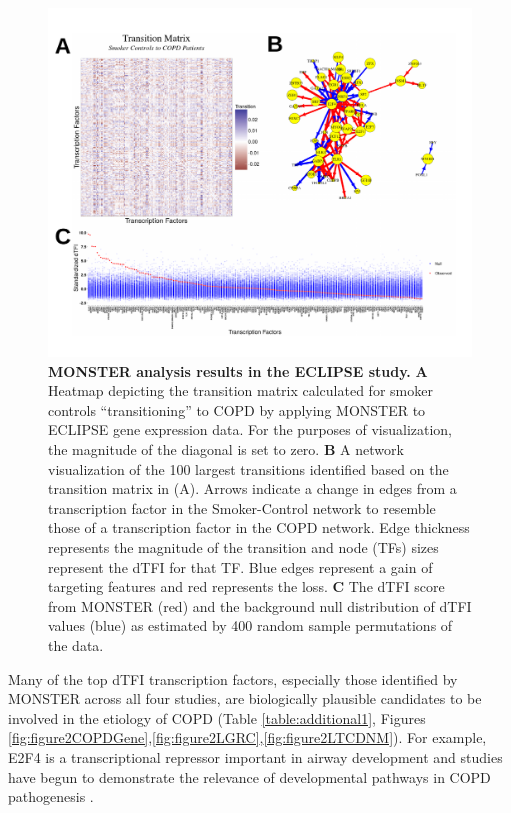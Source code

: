 \begin{figure}%
\centering
\includegraphics[width=1\linewidth]{figures/figure2_labeled}
\caption[MONSTER analysis results in the ECLIPSE study]{\textbf{MONSTER analysis results in the ECLIPSE study.} \textbf{A} Heatmap depicting the transition matrix calculated for smoker controls ``transitioning'' to COPD  by applying MONSTER to ECLIPSE gene expression data. For the purposes of visualization, the magnitude of the diagonal is set to zero. \textbf{B} A network visualization of the 100 largest transitions identified based on the transition matrix  in (A). Arrows indicate a change in edges from a transcription factor in the Smoker-Control network to resemble those of a transcription factor in the COPD network. Edge thickness represents the magnitude of the transition and node (TFs) sizes represent the dTFI for that TF. Blue edges represent a gain of targeting features and red represents the loss. \textbf{C} The dTFI score from MONSTER (red) and the background null distribution of dTFI values (blue) as estimated by 400 random sample permutations of the data.}
\label{fig:ECLIPSE_results}
\end{figure}

Many of the top dTFI transcription factors, especially those identified by MONSTER across all four studies, are biologically plausible candidates to be involved in the etiology of COPD (Table \ref{table:additional1}, Figures \ref{fig:figure2COPDGene},\ref{fig:figure2LGRC},\ref{fig:figure2LTCDNM}). For example, E2F4 is a transcriptional repressor important in airway development \cite{danielian2007e2f4} and studies have begun to demonstrate the relevance of developmental pathways in COPD pathogenesis \cite{boucherat2016bridging}.

